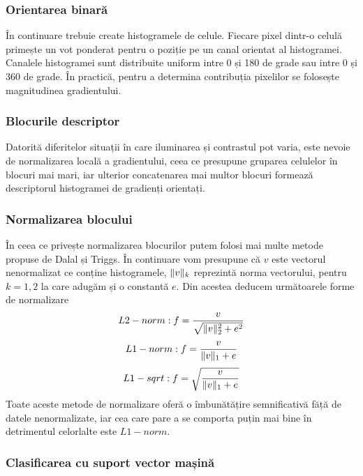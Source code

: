 \subsubsection {Orientarea binară}

În continuare trebuie create histogramele de celule. Fiecare pixel dintr-o celulă primește un vot ponderat pentru o poziție pe un canal orientat al histogramei. Canalele histogramei sunt distribuite uniform intre 0 și 180 de grade sau intre 0 și 360 de grade. În practică, pentru a determina contribuția pixelilor se folosește magnitudinea gradientului.

\subsubsection {Blocurile descriptor}

Datorită diferitelor situații în care iluminarea și contrastul pot varia, este nevoie de normalizarea locală a gradientului, ceea ce presupune gruparea celulelor în blocuri mai mari, iar ulterior concatenarea mai multor blocuri formează descriptorul histogramei de gradienți orientați.

\subsubsection {Normalizarea blocului}

În ceea ce privește normalizarea blocurilor putem folosi mai multe metode propuse de Dalal și Triggs. În continuare vom presupune că $v$ este vectorul nenormalizat ce conține histogramele, $\lVert v\rVert_k$ reprezintă norma vectorului, pentru $k = 1,2$ la care adugăm și o constantă $e$. Din acestea deducem următoarele forme de normalizare
\begin{align}	
	L2-norm: f = \frac{v}{\sqrt{\lVert v\rVert_2^2 + e^2}}
\end{align}
\begin{align}	
	L1-norm: f = \frac{v}{\lVert v\rVert_1 + e}
\end{align}
\begin{align}	
	L1-sqrt: f = \sqrt{\frac{v}{\lVert v\rVert_1 + e}}
\end{align}
Toate aceste metode de normalizare oferă o îmbunătățire semnificativă făță de datele nenormalizate, iar cea care pare a se comporta puțin mai bine în detrimentul celorlalte este $L1-norm$.

\subsubsection {Clasificarea cu suport vector mașină}

